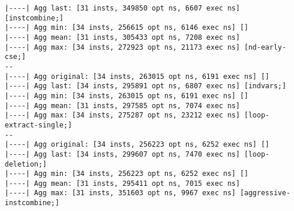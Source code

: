 \documentclass{vldb}
\newcommand{\dbCode}[1]{{\sffamily\small \textbf{#1}}\xspace}
\begin{document}
\begin{lstlisting}[caption={Results of Query \dbCode{INSERT INTO foo VALUES (1)} with No Optimizations}, label={lst:simplenoopt}]
|----| Agg last: [31 insts, 349850 opt ns, 6607 exec ns] [instcombine;]
|----| Agg min: [34 insts, 256615 opt ns, 6146 exec ns] []
|----| Agg mean: [31 insts, 305433 opt ns, 7208 exec ns]
|----| Agg max: [34 insts, 272923 opt ns, 21173 exec ns] [nd-early-cse;]
--
|----| Agg original: [34 insts, 263015 opt ns, 6191 exec ns] []
|----| Agg last: [34 insts, 295891 opt ns, 6807 exec ns] [indvars;]
|----| Agg min: [34 insts, 263015 opt ns, 6191 exec ns] []
|----| Agg mean: [31 insts, 297585 opt ns, 7074 exec ns]
|----| Agg max: [34 insts, 275287 opt ns, 23212 exec ns] [loop-extract-single;]
--
|----| Agg original: [34 insts, 256223 opt ns, 6252 exec ns] []
|----| Agg last: [34 insts, 299607 opt ns, 7470 exec ns] [loop-deletion;]
|----| Agg min: [34 insts, 256223 opt ns, 6252 exec ns] []
|----| Agg mean: [31 insts, 295411 opt ns, 7015 exec ns]
|----| Agg max: [31 insts, 351603 opt ns, 9967 exec ns] [aggressive-instcombine;]
\end{lstlisting}

\clearpage
\end{document}
